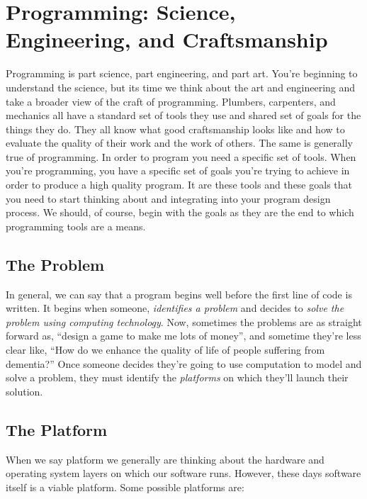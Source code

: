 \documentclass[nobib]{tufte-handout}
\begin{document}
\section{Programming: Science, Engineering, and Craftsmanship}

Programming is part science, part engineering, and part art.  You're beginning to understand the science, but its time we think about the art and engineering and take a broader view of the craft of programming.  Plumbers, carpenters, and mechanics all have a standard set of tools they use and shared set of goals for the things they do.  They all know what good craftsmanship looks like and how to evaluate the quality of their work and the work of others. The same is generally true of programming. In order to program you need a specific set of tools. When you're programming, you have a specific set of goals you're trying to achieve in order to produce a high quality program. It are these tools and these goals that you need to start thinking about and integrating into your program design process.  We should, of course, begin with the goals as they are the end to which programming tools are a means.

\subsection{The Problem}

In general, we can say that a program begins well before the first line of code is written.  It begins when someone, \textit{identifies a problem} and decides to \textit{solve the problem using computing technology}.  Now, sometimes the problems are as straight forward as, ``design a game to make me lots of money'', and sometime they're less clear like, ``How do we enhance the quality of life of people suffering from dementia?''  Once someone decides they're going to use computation to model and solve a problem, they must identify the \textit{platforms} on which they'll launch their solution.


\subsection{The Platform}

When we say platform we generally are thinking about the hardware and operating system layers on which our software runs. However, these days software itself is a viable platform.  Some possible platforms are:
\end{document}
